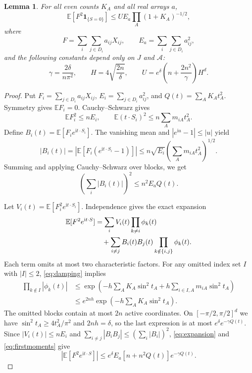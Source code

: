 \documentclass[11pt]{article}
\newtheorem{lemma}[theorem]{Lemma}
\begin{document}
\begin{lemma}\label{lem:numerator}
For all even counts $K_A$ and all real arrays $a$,
\begin{equation}\label{eq:numerator}
 \mathbb E\left[F^2\mathbf1_{\{S=0\}}\right]
 \leq U E_a\prod_A(1+K_A)^{-1/2},
\end{equation}
where
\[
 F=\sum_i\sum_{j\in D_i}a_{ij}X_{ij},\qquad
 E_a=\sum_i\sum_{j\in D_i}a_{ij}^2,
\]
and the following constants depend only on $J$ and $\mathcal A$:
\begin{equation}\label{eq:upperconstants}
 \gamma=\frac{2\delta}{n\pi^2},\qquad
 H=4\sqrt{\frac{2n}{\delta}},\qquad
 U=e^\delta\left(n+\frac{2n^2}{\gamma}\right)H^d.
\end{equation}
\end{lemma}
\begin{proof}
Put $F_i=\sum_{j\in D_i}a_{ij}X_{ij}$,
$E_i=\sum_{j\in D_i}a_{ij}^2$, and $Q(t)=\sum_A K_A t_A^2$.
Symmetry gives $\mathbb EF_i=0$. Cauchy--Schwarz gives
\[
 \mathbb EF_i^2\leq nE_i,\qquad
 \mathbb E(t\cdot S_i)^2\leq n\sum_A m_{iA}t_A^2.
\]
Define $B_i(t)=\mathbb E[F_i e^{\mathrm i t\cdot S_i}]$.
The vanishing mean and $|e^{\mathrm iu}-1|\leq|u|$ yield
\[
 |B_i(t)|
 =\left|\mathbb E[F_i(e^{\mathrm i t\cdot S_i}-1)]\right|
 \leq n\sqrt{E_i}\left(\sum_A m_{iA}t_A^2\right)^{1/2}.
\]
Summing and applying Cauchy--Schwarz over blocks, we get
\begin{equation}\label{eq:firstmoments}
 \left(\sum_i|B_i(t)|\right)^2\leq n^2 E_a Q(t).
\end{equation}

Let $V_i(t)=\mathbb E[F_i^2 e^{\mathrm i t\cdot S_i}]$.
Independence gives the exact expansion
\begin{align}\label{eq:expansion}
 \mathbb E[F^2e^{\mathrm i t\cdot S}]
 &=\sum_i V_i(t)\prod_{k\ne i}\phi_k(t)\notag\\
 &\quad+\sum_{i\ne j}B_i(t)B_j(t)
                         \prod_{k\notin\{i,j\}}\phi_k(t).
\end{align}
Each term omits at most two characteristic factors. For any omitted index
set $I$ with $|I|\leq2$, \eqref{eq:damping} implies
\begin{align*}
 \prod_{k\notin I}|\phi_k(t)|
 &\leq\exp\left(-h\sum_AK_A\sin^2t_A
       +h\sum_{i\in I,A}m_{iA}\sin^2t_A\right)\\
 &\leq e^{2nh}\exp\left(-h\sum_AK_A\sin^2t_A\right).
\end{align*}
The omitted blocks contain at most $2n$ active coordinates. On
$[-\pi/2,\pi/2]^d$ we have $\sin^2t_A\geq4t_A^2/\pi^2$ and $2nh=\delta$,
so the last expression is at most $e^\delta e^{-\gamma Q(t)}$.
Since $|V_i(t)|\leq nE_i$ and
$\sum_{i\ne j}|B_iB_j|\leq(\sum_i|B_i|)^2$,
\eqref{eq:expansion} and \eqref{eq:firstmoments} give
\begin{equation}\label{eq:integrand}
 \left|\mathbb E[F^2e^{\mathrm i t\cdot S}]\right|
 \leq e^\delta E_a[n+n^2Q(t)]e^{-\gamma Q(t)}.
\end{equation}


\end{proof}
\end{document}
